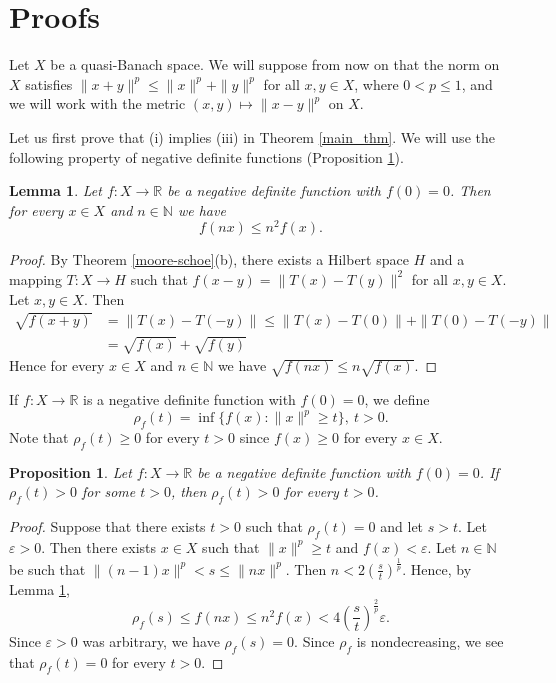 \documentclass[a4paper,oneside]{amsart}
\newtheorem{pro}[thm]{Proposition}
\newtheorem{lem}[thm]{Lemma}
\theoremstyle{definition}
\begin{document}
\section{Proofs}

Let $X$ be a quasi-Banach space. We will suppose from now on that the norm on $X$ satisfies $\|x+y\|^p\leq\|x\|^p+\|y\|^p$ for all $x,y\in X$, where $0<p\leq1$, and we will work with the metric $(x,y)\mapsto\|x-y\|^p$ on $X$.

Let us first prove that (i) implies (iii) in Theorem \ref{main_thm}. We will use the following property of negative definite functions (Proposition \ref{rho_control}).

\begin{lem}\label{neg_def_growth}
Let $f:X\to{\mathbb{R}}$ be a negative definite function with $f(0)=0$. Then for every $x\in X$ and $n\in{\mathbb{N}}$ we have $$f(nx)\leq n^2f(x).$$
\end{lem}
\begin{proof}
By Theorem \ref{moore-schoe}(b), there exists a Hilbert space $H$ and a mapping $T:X\to H$ such that $f(x-y)=\|T(x)-T(y)\|^2$ for all $x,y\in X$. Let $x,y\in X$. Then
\begin{align*}
\sqrt{f(x+y)}&=\|T(x)-T(-y)\|\leq\|T(x)-T(0)\|+\|T(0)-T(-y)\|\\
&=\sqrt{f(x)}+\sqrt{f(y)}
\end{align*}
Hence for every $x\in X$ and $n\in{\mathbb{N}}$ we have $\sqrt{f(nx)}\leq n\sqrt{f(x)}$.
\end{proof}

If $f:X\to{\mathbb{R}}$ is a negative definite function with $f(0)=0$, we define 
$$\rho_f(t)=\inf\{f(x):\|x\|^p\geq t\},\ t>0.$$
Note that $\rho_f(t)\geq0$ for every $t>0$ since $f(x)\geq0$ for every $x\in X$.

\begin{pro}\label{rho_control}
Let $f:X\to{\mathbb{R}}$ be a negative definite function with $f(0)=0$. If $\rho_f(t)>0$ for some $t>0$, then $\rho_f(t)>0$ for every $t>0$.
\end{pro}
\begin{proof}
Suppose that there exists $t>0$ such that $\rho_f(t)=0$ and let $s>t$. Let $\varepsilon>0$. Then there exists $x\in X$ such that $\|x\|^p\geq t$ and $f(x)<\varepsilon$. Let $n\in{\mathbb{N}}$ be such that $\|(n-1)x\|^p<s\leq\|nx\|^p$. Then $n<2\left(\frac{s}{t}\right)^\frac{1}{p}$. Hence, by Lemma \ref{neg_def_growth},
$$\rho_f(s)\leq f(nx)\leq n^2f(x)<4\left(\frac{s}{t}\right)^\frac{2}{p}\varepsilon.$$
Since $\varepsilon>0$ was arbitrary, we have $\rho_f(s)=0$. Since $\rho_f$ is nondecreasing, we see that $\rho_f(t)=0$ for every $t>0$. 
\end{proof}
\end{document}
